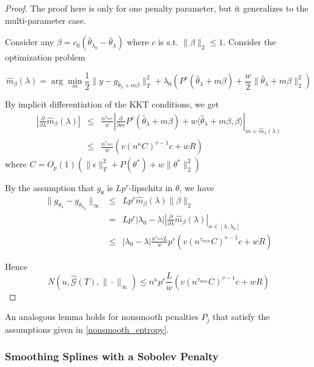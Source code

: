\documentclass[12pt]{article}
\begin{document}
\begin{proof}
The proof here is only for one penalty parameter, but it generalizes to the multi-parameter case.

Consider any $\beta=c_{0}\left(\hat{\theta}_{\lambda_{0}}-\hat{\theta}_{\lambda}\right)$
where $c$ is s.t. $\|\beta\|_{2}\le1$. Consider the optimization
problem

\[
\hat{m}_{\beta}(\lambda)=\arg\min_{m}\frac{1}{2}\|y-g_{\hat{\theta}_{\lambda}+m\beta}\|_{T}^{2}+\lambda_{0}\left(P^{v}(\hat{\theta}_{\lambda}+m\beta)+\frac{w}{2}\|\hat{\theta}_{\lambda}+m\beta\|_{2}^{2}\right)
\]


By implicit differentiation of the KKT conditions, we get
\begin{eqnarray*}
\left|\frac{\partial}{\partial\lambda}\hat{m}_{\beta}(\lambda)\right|
 & \le & \frac{n^{\tau_{min}}}{w}\left|\frac{\partial}{\partial m}P^{v}(\hat{\theta}_{\lambda}+m\beta)+w\langle\hat{\theta}_{\lambda}+m\beta,\beta\rangle\right|_{m=\hat{m}_{\lambda}(\lambda)}\\
  & \le & \frac{n^{\tau_{min}}}{w}\left(v\left(n^{\kappa}C\right)^{v-1}c+wR\right)
\end{eqnarray*}
where $C = O_p(1) \left (\|\epsilon \|_{T}^{2}+ P(\theta^{*})+w \|\theta^{*}\|_{2}^{2} \right )$

By the assumption that $g_{\theta}$ is $Lp^r$-lipschitz in $\theta$, we have 
\begin{eqnarray*}
\|g_{\theta_{\lambda}}-g_{\theta_{\lambda_{0}}}\|_{\infty} 
& \le & Lp^{r}\hat{m}_{\beta}(\lambda)\|\beta\|_{2}\\
 & = & Lp^{r}|\lambda_{0}-\lambda|\left|\frac{\partial}{\partial\lambda}\hat{m}_{\beta}(\lambda)\right|_{\alpha \in [\lambda, \lambda_0]}\\
 & \le & |\lambda_0 - \lambda|\frac{n^{\tau_{min}}L}{w}p^{r}\left(v\left(n^{\tau_{min}}C\right)^{v-1}c+wR\right)
\end{eqnarray*}


Hence
\[
N\left(u,\hat{\mathcal{G}}(T),\|\cdot\|_{\infty}\right)\le n^{\kappa}p^{r}\frac{L}{w}\left(v\left(n^{\tau_{min}}C\right)^{v-1}c+wR\right)
\]

\end{proof}
An analogous lemma holds for nonsmooth penalties $P_j$ that satisfy the assumptions given in \ref{nonsmooth_entropy}.

\subsubsection{Smoothing Splines with a Sobolev Penalty}
\end{document}
